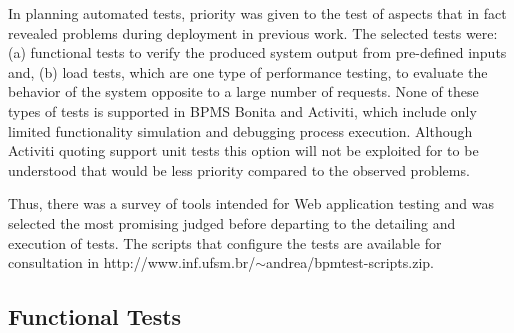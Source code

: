\documentclass[runningheads,a4paper]{llncs}
\begin{document}
In planning automated tests, priority was given to the test of aspects that in fact revealed problems during deployment in previous work. The selected tests were: (a) functional tests to verify the produced system output from pre-defined inputs and, (b) load tests, which are one type of performance testing, to evaluate the behavior of the system  opposite to a large number of requests. None of these types of tests is supported in BPMS Bonita and Activiti, which include only limited functionality simulation and debugging process execution. Although Activiti quoting support unit tests  this option will not be exploited for to be understood that would be less priority compared to the observed problems.

Thus, there was a survey of tools intended for Web application testing and was selected the most promising judged before departing to the detailing and execution of tests. The scripts that configure the tests are available for consultation in http://www.inf.ufsm.br/$\sim$andrea/bpmtest-scripts.zip.

\subsection{Functional Tests}

\end{document}
